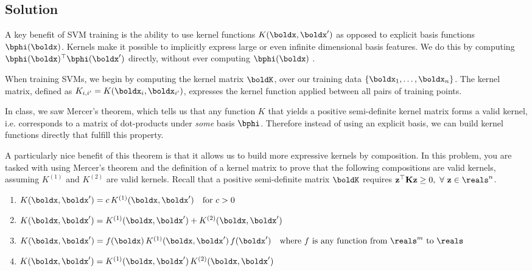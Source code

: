 \documentclass[submit]{harvardml}
\begin{document}
\subsection*{Solution}




\newpage
\begin{problem}


  A key benefit of SVM training is the ability to use kernel functions
  $K(\boldx, \boldx')$ as opposed to explicit basis functions
  $\bphi(\boldx)$. Kernels make it possible to implicitly express
  large or even infinite dimensional basis features. We do this 
  by computing $\bphi(\boldx)^\top\bphi(\boldx')$ directly, without ever computing $\bphi(\boldx)$ .

  When training SVMs, we begin by computing the kernel matrix $\boldK$,
  over our training data $\{\boldx_1, \ldots, \boldx_n\}$.  The kernel
  matrix, defined as $K_{i, i'} = K(\boldx_i, \boldx_{i'})$, expresses
  the kernel function applied between all pairs of training points.

  In class, we saw Mercer's theorem, which tells us that any function
  $K$ that yields a positive semi-definite kernel matrix forms a valid
  kernel, i.e. corresponds to a matrix of dot-products under
  \textit{some} basis $\bphi$. Therefore instead of using an explicit
  basis, we can build kernel functions directly that fulfill this
  property.

  A particularly nice benefit of this theorem is that it allows us to
  build more expressive kernels by composition.  In this problem, you
  are tasked with using Mercer's theorem and the definition of a
  kernel matrix to prove that the following  compositions are valid kernels, 
  assuming $K^{(1)}$ and $K^{(2)}$ are valid kernels. Recall that a positive semi-definite matrix $\boldK$ requires $\mathbf{z}^\top \mathbf{Kz} \geq 0,\ \forall\ \mathbf{z} \in \reals^n$.

  \begin{enumerate}
  \item $K(\boldx, \boldx') = c\,K^{(1)}(\boldx, \boldx') \quad \text{for $c>0$}$
  \item $ 	K(\boldx, \boldx')= K^{(1)}(\boldx, \boldx') + K^{(2)}(\boldx, \boldx')$
  \item   $ K(\boldx, \boldx') = f(\boldx)\,K^{(1)}(\boldx, \boldx')\,f(\boldx') \quad
  \text{where $f$ is any function from~$\reals^m$ to $\reals$}$
  \item $ K(\boldx, \boldx') = K^{(1)}(\boldx, \boldx')\,K^{(2)}(\boldx,
  \boldx')$


\end{enumerate}
\end{problem}
\end{document}
